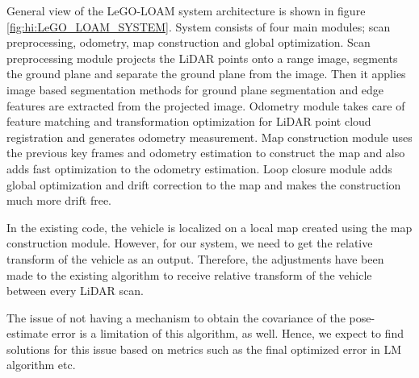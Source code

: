 General view of the \gls{LeGO-LOAM} system architecture is shown in figure \ref{fig:hi:LeGO_LOAM_SYSTEM}. System consists of four main modules; scan preprocessing, odometry, map construction and global optimization. Scan preprocessing module projects the \gls{LiDAR} points onto a range image, segments the ground plane and separate the ground plane from the image. Then it applies image based segmentation methods for ground plane segmentation and edge features  are extracted from the projected image. Odometry module takes care of feature matching and transformation optimization for \gls{LiDAR} point cloud registration and generates odometry measurement. Map construction module uses the previous key frames and odometry estimation to construct the map and also adds fast optimization to the odometry estimation. Loop closure module adds global optimization and drift correction to the map and makes the construction much more drift free.

In the existing code, the vehicle is localized on a local map created using the map construction module. However, for our system, we need to get the relative transform of the vehicle as an output. Therefore, the adjustments have been made to the existing algorithm to receive relative transform of the vehicle between every \gls{LiDAR} scan.

The issue of not having a mechanism to obtain the covariance of the pose-estimate error is a limitation of this algorithm, as well. Hence, we expect to find solutions for this issue based on metrics such as the final optimized error in \gls{LM} algorithm \cite{hi:LM_optimization} etc.












